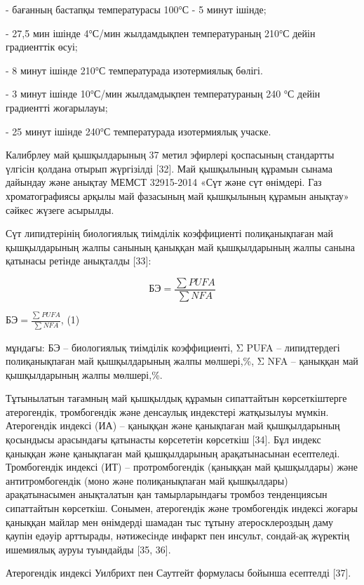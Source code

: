 - бағанның бастапқы температурасы 100°С - 5 минут ішінде;

- 27,5 мин ішінде 4°С/мин жылдамдықпен температураның 210°С дейін
градиенттік өсуі;

- 8 минут ішінде 210°С температурада изотермиялық бөлігі.

- 3 минут ішінде 10°С/мин жылдамдықпен температураның 240 °С дейін
градиентті жоғарылауы;

- 25 минут ішінде 240°С температурада изотермиялық учаске.

Калибрлеу май қышқылдарының 37 метил эфирлері қоспасының стандартты
үлгісін қолдана отырып жүргізілді {[}32{]}. Май қышқылының құрамын
сынама дайындау және анықтау МЕМСТ 32915-2014 «Сүт және сүт өнімдері.
Газ хроматографиясы арқылы май фазасының май қышқылының құрамын анықтау»
сәйкес жүзеге асырылды.

Сүт липидтерінің биологиялық тиімділік коэффициенті полиқанықпаған май
қышқылдарының жалпы санының қаныққан май қышқылдарының жалпы санына
қатынасы ретінде анықталды {[}33{]}:

\begin{equation}
  БЭ = \frac{\sum PUFA}{\sum NFA}
\end{equation}

\(БЭ = \frac{\sum_{}^{}{PUFA}}{\sum_{}^{}{NFA}}\), (1)

мұндағы: БЭ -- биологиялық тиімділік коэффициенті, Σ PUFA --
липидтердегі полиқанықпаған май қышқылдарының жалпы мөлшері,\%, Σ NFA --
қаныққан май қышқылдарының жалпы мөлшері,\%.

Тұтынылатын тағамның май қышқылдық құрамын сипаттайтын көрсеткіштерге
атерогендік, тромбогендік және денсаулық индекстері жатқызылуы мүмкін.
Атерогендік индексі (ИА) -- қаныққан және қанықпаған май қышқылдарының
қосындысы арасындағы қатынасты көрсететін көрсеткіш {[}34{]}. Бұл индекс
қаныққан және қанықпаған май қышқылдарының арақатынасынан есептеледі.
Тромбогендік индексі (ИТ) -- протромбогендік (қаныққан май қышқылдары)
және антитромбогендік (моно және полиқанықпаған май қышқылдары)
арақатынасымен анықталатын қан тамырларындағы тромбоз тенденциясын
сипаттайтын көрсеткіш. Сонымен, атерогендік және тромбогендік индексі
жоғары қаныққан майлар мен өнімдерді шамадан тыс тұтыну атеросклероздың
даму қаупін едәуір арттырады, нәтижесінде инфаркт пен инсульт, сондай-ақ
жүректің ишемиялық ауруы туындайды {[}35, 36{]}.

Атерогендік индексі Уилбрихт пен Саутгейт формуласы бойынша есептелді
{[}37{]}.

